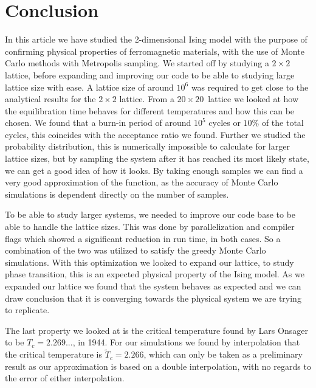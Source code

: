 \documentclass[%
reprint,
nofootinbib,
amsmath,amssymb,
aps,
]{revtex4-1}
\begin{document}
\section{Conclusion} %
In this article we have studied the 2-dimensional Ising model with the purpose of confirming physical properties of ferromagnetic materials, with the use of Monte Carlo methods with Metropolis sampling. 
We started off by studying a $2\times 2$ lattice, before expanding and improving our code to be able to studying large lattice size with ease. A lattice size of around $10^6$ was required to get close to the analytical results for the $2\times 2$ lattice. From a $20\times 20$ lattice we looked at how the equilibration time behaves for different temperatures and how this can be chosen. We found that a burn-in period of around $10^5$ cycles or $10\%$ of the total cycles, this coincides with the acceptance ratio we found. 
Further we studied the probability distribution, this is numerically impossible to calculate for larger lattice sizes, but by sampling the system after it has reached its most likely state, we can get a good idea of how it looks. By taking enough samples we can find a very good approximation of the function, as the accuracy of Monte Carlo simulations is dependent directly on the number of samples. 

To be able to study larger systems, we needed to improve our code base to be able to handle the lattice sizes. This was done by parallelization and compiler flags which showed a significant reduction in run time, in both cases. So a combination of the two was utilized to satisfy the greedy Monte Carlo simulations. 
With this optimization we looked to expand our lattice, to study phase transition, this is an expected physical property of the Ising model. As we expanded our lattice we found that the system behaves as expected and we can draw conclusion that it is converging towards the physical system we are trying to replicate. 

The last property we looked at is the critical temperature found by Lars Onsager\cite{LarsOnsager} to be $T_c = 2.269...$, in 1944. For our simulations we found by interpolation that the critical temperature is $\tilde{T}_c = 2.266$, which can only be taken as a preliminary result as our approximation is based on a double interpolation, with no regards to the error of either interpolation. 


\end{document}
